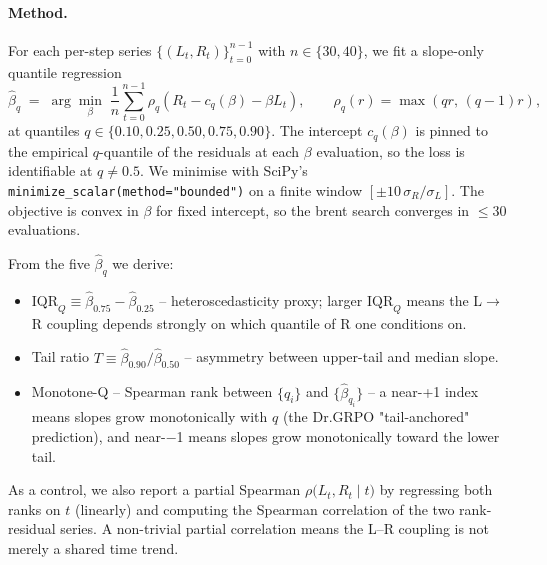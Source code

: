 \paragraph{Method.}  For each per-step series $\{(L_t, R_t)\}_{t=0}^{n-1}$
with $n\!\in\!\{30,40\}$, we fit a slope-only quantile regression
\[
\hat\beta_q \;=\; \arg\min_{\beta}\;\frac1n\sum_{t=0}^{n-1}
\rho_q\!\left(R_t - c_q(\beta) - \beta L_t\right),
\qquad \rho_q(r) = \max(q r,\,(q-1)r),
\]
at quantiles $q\!\in\!\{0.10, 0.25, 0.50, 0.75, 0.90\}$.  The intercept
$c_q(\beta)$ is pinned to the empirical $q$-quantile of the residuals at
each $\beta$ evaluation, so the loss is identifiable at $q\ne 0.5$.
We minimise with SciPy's \texttt{minimize\_scalar(method="bounded")} on a
finite window $[\pm 10 \,\sigma_R/\sigma_L]$.  The objective is convex in
$\beta$ for fixed intercept, so the brent search converges in $\le 30$
evaluations.

From the five $\hat\beta_q$ we derive:
\begin{itemize}
\item $\mathrm{IQR}_Q \equiv \hat\beta_{0.75} - \hat\beta_{0.25}$
      -- heteroscedasticity proxy; larger $\mathrm{IQR}_Q$ means the
      L$\!\rightarrow\!$R coupling depends strongly on which quantile of R
      one conditions on.
\item Tail ratio $T \equiv \hat\beta_{0.90} / \hat\beta_{0.50}$
      -- asymmetry between upper-tail and median slope.
\item Monotone-Q -- Spearman rank between $\{q_i\}$ and $\{\hat\beta_{q_i}\}$
      -- a near-+1 index means slopes grow monotonically with $q$ (the
      Dr.GRPO "tail-anchored" prediction), and near-$-$1 means slopes grow
      monotonically toward the lower tail.
\end{itemize}
As a control, we also report a partial Spearman
$\rho\!\bigl(L_t, R_t \mid t\bigr)$ by regressing both ranks on $t$
(linearly) and computing the Spearman correlation of the two
rank-residual series.  A non-trivial partial correlation means the
L--R coupling is not merely a shared time trend.

